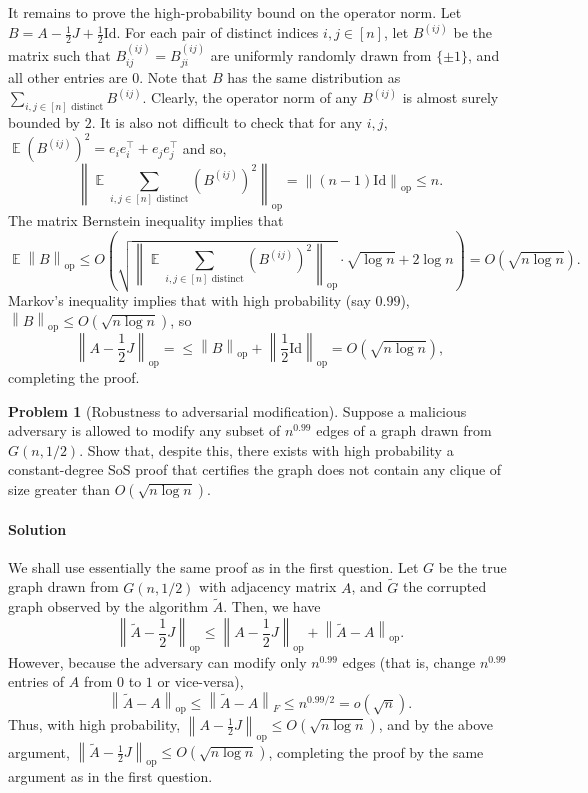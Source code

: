 \documentclass[11pt]{article}
\theoremstyle{definition}
\newtheorem{problem}[theorem]{Problem}
\newcommand{\norm}[1]{\left\| #1 \right\|}
\newcommand{\wt}[1]{\widetilde{#1}}
\DeclareMathOperator{\E}{\mathbb{E}} %
\newcommand{\Id}{\mathrm{Id}}
\newcommand{\opnorm}[1]{\left\|#1\right\|_{\mathrm{op}}}
\begin{document}
  It remains to prove the high-probability bound on the operator norm. Let $B = A - \frac{1}{2} J + \frac{1}{2} \Id$. For each pair of distinct indices $i,j \in [n]$, let $B^{(ij)}$ be the matrix such that $B^{(ij)}_{ij} = B^{(ij)}_{ji}$ are uniformly randomly drawn from $\{\pm 1\}$, and all other entries are $0$. Note that $B$ has the same distribution as $\sum_{i,j \in [n] \text{ distinct}} B^{(ij)}$. Clearly, the operator norm of any $B^{(ij)}$ is almost surely bounded by $2$. It is also not difficult to check that for any $i,j$, $\E (B^{(ij)})^2 = e_i e_i^\top + e_j e_j^\top$ and so,
  \[ \opnorm{\E \sum_{i,j \in [n] \text{ distinct}} (B^{(ij)})^2} = \opnorm{ (n-1) \Id } \le n. \]
  The matrix Bernstein inequality implies that
  \[ \E \opnorm{B} \le O\left( \sqrt{ \opnorm{ \E \sum_{i,j \in [n] \text{ distinct}} (B^{(ij)})^2 } } \cdot \sqrt{\log n} + 2 \log n \right) = O(\sqrt{n \log n}). \]
  Markov's inequality implies that with high probability (say $0.99$), $\opnorm{B} \le O(\sqrt{n \log n})$, so
  \[ \opnorm{ A - \frac{1}{2} J } = \le \opnorm{B} + \opnorm{ \frac{1}{2} \Id } = O(\sqrt{n \log n}), \]
  completing the proof.

\clearpage

\begin{problem}[Robustness to adversarial modification]
  Suppose a malicious adversary is allowed to modify any subset of $n^{0.99}$ edges of a graph drawn from $G(n,1/2)$. Show that, despite this, there exists with high probability a constant-degree SoS proof that certifies the graph does not contain any clique of size greater than $O(\sqrt{n \log n})$.
\end{problem}

\paragraph{Solution}

  We shall use essentially the same proof as in the first question. Let $G$ be the true graph drawn from $G(n,1/2)$ with adjacency matrix $A$, and $\wt{G}$ the corrupted graph observed by the algorithm $\wt{A}$. Then, we have
  \[ \opnorm{\wt{A} - \frac{1}{2} J} \le \opnorm{ A - \frac{1}{2} J} + \opnorm{\wt{A} - A}. \]
  However, because the adversary can modify only $n^{0.99}$ edges (that is, change $n^{0.99}$ entries of $A$ from $0$ to $1$ or vice-versa),
  \[ \opnorm{\wt{A} - A} \le \norm{\wt{A} - A}_F \le n^{0.99/2} = o(\sqrt{n}). \]
  Thus, with high probability, $\opnorm{ A - \frac{1}{2} J } \le O(\sqrt{n \log n})$, and by the above argument, $\opnorm{\wt{A} - \frac{1}{2} J} \le O(\sqrt{n \log n})$, completing the proof by the same argument as in the first question.
\end{document}
